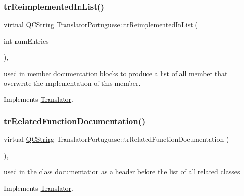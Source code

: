\mbox{\label{class_translator_portuguese_aaf262ebbeb4dc61cf9df31a8f7cd5ff2}} 
\subsubsection{\texorpdfstring{trReimplementedInList()}{trReimplementedInList()}}
{\footnotesize\ttfamily virtual \mbox{\hyperlink{class_q_c_string}{Q\+C\+String}} Translator\+Portuguese\+::tr\+Reimplemented\+In\+List (\begin{DoxyParamCaption}\item[{int}]{num\+Entries }\end{DoxyParamCaption})\hspace{0.3cm}{\ttfamily [inline]}, {\ttfamily [virtual]}}

used in member documentation blocks to produce a list of all member that overwrite the implementation of this member. 

Implements \mbox{\hyperlink{class_translator}{Translator}}.

\mbox{\label{class_translator_portuguese_a4e5b7585447dbdfb983640c410ff50e8}} 
\subsubsection{\texorpdfstring{trRelatedFunctionDocumentation()}{trRelatedFunctionDocumentation()}}
{\footnotesize\ttfamily virtual \mbox{\hyperlink{class_q_c_string}{Q\+C\+String}} Translator\+Portuguese\+::tr\+Related\+Function\+Documentation (\begin{DoxyParamCaption}{ }\end{DoxyParamCaption})\hspace{0.3cm}{\ttfamily [inline]}, {\ttfamily [virtual]}}

used in the class documentation as a header before the list of all related classes 

Implements \mbox{\hyperlink{class_translator}{Translator}}.

